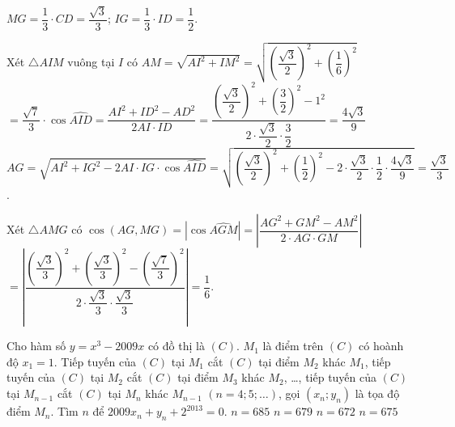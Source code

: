 \begin{ex}
{\begin{description}
			$MG = \dfrac{1}{3}\cdot CD = \dfrac{\sqrt{3}}{3}$; 
			$IG = \dfrac{1}{3}\cdot ID = \dfrac{1}{2}$.	
			\item Xét $\triangle AIM$ vuông tại $I$ có $AM = \sqrt{AI^2 + IM^2} = \sqrt{\left(\dfrac{\sqrt{3}}{2}\right)^2 + \left(\dfrac{1}{6}\right)^2}$\\
			$  = \dfrac{\sqrt{7}}{3}\cdot \cos\widehat{AID} = \dfrac{AI^2 + ID^2 - AD^2}{2AI \cdot ID} = \dfrac{\left(\dfrac{\sqrt 3}{2}\right)^2 + \left(\dfrac{3}{2}\right)^2 - 1^2}{2\cdot \dfrac{\sqrt 3 }{2}\cdot \dfrac{3}{2}} = \dfrac{4\sqrt 3}{9}$ \\
			$AG = \sqrt{AI^2 + IG^2 - 2AI\cdot IG\cdot \cos\widehat{AID}}  = \sqrt{\left(\dfrac{\sqrt{3}}{2}\right)^2 +\left( {\dfrac{1}{2}}\right)^2 - 2\cdot \dfrac{\sqrt{3}}{2}\cdot \dfrac{1}{2}\cdot \dfrac{4\sqrt{3}}{9}}  = \dfrac{\sqrt{3}}{3}$.
			\item Xét $\triangle AMG$ có
			$\cos(AG,MG) = \left|\cos\widehat{AGM}\right|= \left| \dfrac{AG^2 + GM^2 - AM^2}{2\cdot AG\cdot GM}\right|$\\
			$= \left| \dfrac{\left(\dfrac{\sqrt 3}{3}\right)^2 + \left( \dfrac{\sqrt 3}{3}\right)^2 - \left(\dfrac{\sqrt 7}{3}\right)^2}{2\cdot \dfrac{\sqrt 3}{3}\cdot \dfrac{\sqrt 3}{3}} \right| = \dfrac{1}{6}$.
		\end{description}
	}
\end{ex}
\begin{ex}%
	Cho hàm số $y = x^3 - 2009x$ có đồ thị là $(C)$. $M_1$ là điểm trên $(C)$ có hoành độ $x_1 = 1$. Tiếp tuyến của $(C)$ tại $M_1$ cắt $(C)$ tại điểm $M_2$ khác $M_1$, tiếp tuyến của $(C)$ tại $M_2$ cắt $(C)$ tại điểm $M_3$ khác $M_2$, \ldots, tiếp tuyến của $(C)$ tại $M_{n - 1}$ cắt $(C)$ tại $M_n$ khác $M_{n - 1}$ $(n = 4;5;\ldots)$, gọi $(x_n;y_n)$ là tọa độ điểm $M_n$. Tìm $n$ để $2009x_n + y_n + 2^{2013} = 0$.
	\choice
	{$n = 685$}
	{$n = 679$}
	{\True $n = 672$}
	{$n = 675$}
\end{ex}

